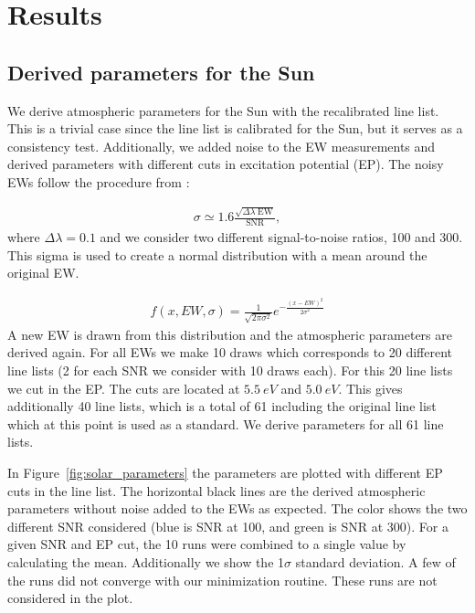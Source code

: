 \documentclass{aa}
\begin{document}
\section{Results}
\label{sec:results}


\subsection{Derived parameters for the Sun}
\label{sec:derived_parameters_of_the_sun}

We derive atmospheric parameters for the Sun with the recalibrated line
list. This is a trivial case since the line list is calibrated for the
Sun, but it serves as a consistency test. Additionally, we added noise
to the EW measurements and derived parameters with different cuts in
excitation potential (EP). The noisy EWs follow the procedure from
\cite{Caryel1988}:

\begin{align}
    \sigma \simeq 1.6 \frac{\sqrt{\Delta\lambda\; \mathrm{EW}}}{\mathrm{SNR}},
\end{align}
where $\Delta\lambda=0.1$ and we consider two different signal-to-noise
ratios, 100 and 300. This sigma is used to create a normal distribution
with a mean around the original EW.

\begin{align}
    f(x, EW, \sigma) = \frac{1}{\sqrt{2\pi\sigma^2}} e^{-\frac{(x-EW)^2}{2\sigma^2}}
\end{align}
A new EW is drawn from this distribution and the atmospheric parameters
are derived again. For all EWs we make 10 draws which corresponds to
20 different line lists (2 for each SNR we consider with 10 draws
each). For this 20 line lists we cut in the EP. The cuts are located
at $\SI{5.5}{eV}$ and $\SI{5.0}{eV}$. This gives additionally 40 line
lists, which is a total of 61 including the original line list which at
this point is used as a standard. We derive parameters for all 61 line
lists.


In Figure~\ref{fig:solar_parameters} the parameters are plotted with
different EP cuts in the line list. The horizontal black lines are
the derived atmospheric parameters without noise added to the EWs as
expected. The color shows the two different SNR considered (blue is
SNR at 100, and green is SNR at 300). For a given SNR and EP cut,
the 10 runs were combined to a single value by calculating the mean.
Additionally we show the 1$\sigma$ standard deviation. A few of the
runs did not converge with our minimization routine. These runs are not
considered in the plot.
\end{document}
